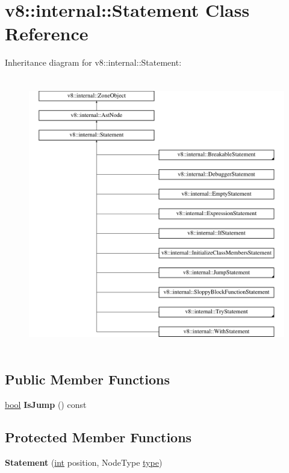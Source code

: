\hypertarget{classv8_1_1internal_1_1Statement}{}\section{v8\+:\+:internal\+:\+:Statement Class Reference}
\label{classv8_1_1internal_1_1Statement}
Inheritance diagram for v8\+:\+:internal\+:\+:Statement\+:\begin{figure}[H]
\begin{center}
\leavevmode
\includegraphics[height=12.000000cm]{classv8_1_1internal_1_1Statement}
\end{center}
\end{figure}
\subsection*{Public Member Functions}
\begin{DoxyCompactItemize}
\item 
\mbox{\label{classv8_1_1internal_1_1Statement_a91cbb33e7c186c2ab9e8ea187e1c3cb0}} 
\mbox{\hyperlink{classbool}{bool}} {\bfseries Is\+Jump} () const
\end{DoxyCompactItemize}
\subsection*{Protected Member Functions}
\begin{DoxyCompactItemize}
\item 
\mbox{\label{classv8_1_1internal_1_1Statement_a9e1cead53bc83a91e33277189d6c87d6}} 
{\bfseries Statement} (\mbox{\hyperlink{classint}{int}} position, Node\+Type \mbox{\hyperlink{classstd_1_1conditional_1_1type}{type}})
\end{DoxyCompactItemize}
